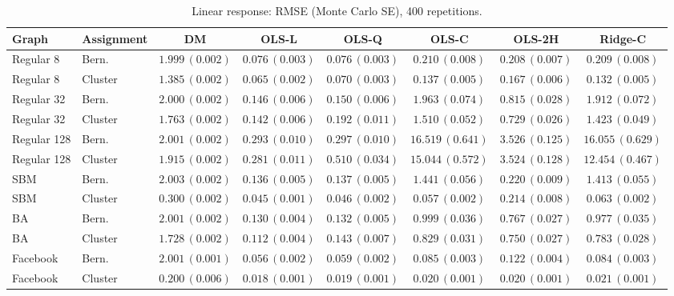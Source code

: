 \begin{table}[t]
\centering\scriptsize
\caption{Linear response: RMSE (Monte Carlo SE), 400 repetitions.}
\begin{tabular}{llcccccc}
\toprule
Graph & Assignment & DM & OLS-L & OLS-Q & OLS-C & OLS-2H & Ridge-C \\
\midrule
Regular 8 & Bern. & $1.999\,(0.002)$ & $0.076\,(0.003)$ & $0.076\,(0.003)$ & $0.210\,(0.008)$ & $0.208\,(0.007)$ & $0.209\,(0.008)$ \\
Regular 8 & Cluster & $1.385\,(0.002)$ & $0.065\,(0.002)$ & $0.070\,(0.003)$ & $0.137\,(0.005)$ & $0.167\,(0.006)$ & $0.132\,(0.005)$ \\
Regular 32 & Bern. & $2.000\,(0.002)$ & $0.146\,(0.006)$ & $0.150\,(0.006)$ & $1.963\,(0.074)$ & $0.815\,(0.028)$ & $1.912\,(0.072)$ \\
Regular 32 & Cluster & $1.763\,(0.002)$ & $0.142\,(0.006)$ & $0.192\,(0.011)$ & $1.510\,(0.052)$ & $0.729\,(0.026)$ & $1.423\,(0.049)$ \\
Regular 128 & Bern. & $2.001\,(0.002)$ & $0.293\,(0.010)$ & $0.297\,(0.010)$ & $16.519\,(0.641)$ & $3.526\,(0.125)$ & $16.055\,(0.629)$ \\
Regular 128 & Cluster & $1.915\,(0.002)$ & $0.281\,(0.011)$ & $0.510\,(0.034)$ & $15.044\,(0.572)$ & $3.524\,(0.128)$ & $12.454\,(0.467)$ \\
SBM & Bern. & $2.003\,(0.002)$ & $0.136\,(0.005)$ & $0.137\,(0.005)$ & $1.441\,(0.056)$ & $0.220\,(0.009)$ & $1.413\,(0.055)$ \\
SBM & Cluster & $0.300\,(0.002)$ & $0.045\,(0.001)$ & $0.046\,(0.002)$ & $0.057\,(0.002)$ & $0.214\,(0.008)$ & $0.063\,(0.002)$ \\
BA & Bern. & $2.001\,(0.002)$ & $0.130\,(0.004)$ & $0.132\,(0.005)$ & $0.999\,(0.036)$ & $0.767\,(0.027)$ & $0.977\,(0.035)$ \\
BA & Cluster & $1.728\,(0.002)$ & $0.112\,(0.004)$ & $0.143\,(0.007)$ & $0.829\,(0.031)$ & $0.750\,(0.027)$ & $0.783\,(0.028)$ \\
Facebook & Bern. & $2.001\,(0.001)$ & $0.056\,(0.002)$ & $0.059\,(0.002)$ & $0.085\,(0.003)$ & $0.122\,(0.004)$ & $0.084\,(0.003)$ \\
Facebook & Cluster & $0.200\,(0.006)$ & $0.018\,(0.001)$ & $0.019\,(0.001)$ & $0.020\,(0.001)$ & $0.020\,(0.001)$ & $0.021\,(0.001)$ \\
\bottomrule
\end{tabular}
\end{table}
